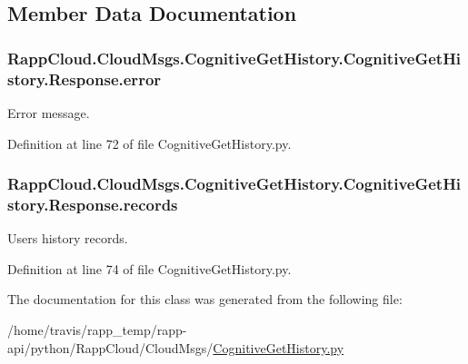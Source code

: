 \subsection{Member Data Documentation}
\hypertarget{classRappCloud_1_1CloudMsgs_1_1CognitiveGetHistory_1_1CognitiveGetHistory_1_1Response_ad86856095112982a4b4de67183d08cb1}{
\subsubsection[{error}]{\setlength{\rightskip}{0pt plus 5cm}Rapp\-Cloud.\-Cloud\-Msgs.\-Cognitive\-Get\-History.\-Cognitive\-Get\-History.\-Response.\-error}}\label{classRappCloud_1_1CloudMsgs_1_1CognitiveGetHistory_1_1CognitiveGetHistory_1_1Response_ad86856095112982a4b4de67183d08cb1}


Error message. 



Definition at line 72 of file Cognitive\-Get\-History.\-py.

\hypertarget{classRappCloud_1_1CloudMsgs_1_1CognitiveGetHistory_1_1CognitiveGetHistory_1_1Response_a7cdbfcc90729b4af6dc637191b9e4490}{
\subsubsection[{records}]{\setlength{\rightskip}{0pt plus 5cm}Rapp\-Cloud.\-Cloud\-Msgs.\-Cognitive\-Get\-History.\-Cognitive\-Get\-History.\-Response.\-records}}\label{classRappCloud_1_1CloudMsgs_1_1CognitiveGetHistory_1_1CognitiveGetHistory_1_1Response_a7cdbfcc90729b4af6dc637191b9e4490}


Users history records. 



Definition at line 74 of file Cognitive\-Get\-History.\-py.



The documentation for this class was generated from the following file\-:\begin{DoxyCompactItemize}
\item 
/home/travis/rapp\-\_\-temp/rapp-\/api/python/\-Rapp\-Cloud/\-Cloud\-Msgs/\hyperlink{CognitiveGetHistory_8py}{Cognitive\-Get\-History.\-py}\end{DoxyCompactItemize}
